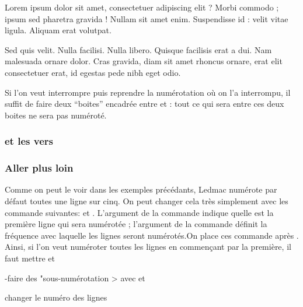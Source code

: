 \begin{minipage}{10cm}
\beginnumbering
\pstart %
Lorem ipsum dolor sit amet, consectetuer adipiscing elit ?
Morbi commodo ; ipsum sed pharetra gravida !
Nullam sit amet enim. Suspendisse id : velit vitae ligula. 
Aliquam erat volutpat.\pend

Sed quis velit. Nulla facilisi. Nulla libero. 
 Quisque facilisis erat a dui. %
Nam malesuada ornare dolor.
Cras gravida, diam sit amet rhoncus ornare, 
erat  elit consectetuer erat, id egestas pede nibh eget odio.
\pend
\endnumbering
\end{minipage}


Si l'on veut interrompre puis reprendre la numérotation où on l'a interrompu, il suffit de faire deux \enquote{boites} encadrée entre  et :  tout ce qui sera entre ces deux boites ne sera pas numéroté.

\subsubsection{ et les vers}


\subsubsection{Aller plus loin}
Comme on peut le voir dans les exemples précédants, Ledmac numérote par défaut toutes une ligne sur cinq. On peut changer cela très simplement avec les commande suivantes:
 et .
L'argument  de la commande  indique quelle est  la première ligne qui sera numérotée ; l'argument  de la commande  définit la fréquence avec laquelle les lignes seront numérotés.On place ces commande après . Ainsi, si l'on veut numéroter toutes les lignes en commençant par la première, il faut mettre  et  




-faire des "sous-numérotation
> avec  
et 

changer le numéro des lignes

